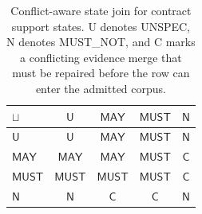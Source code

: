 \begin{table}[t]
\centering
\caption{Conflict-aware state join for contract support states. U denotes UNSPEC, N denotes MUST\_NOT, and C marks a conflicting evidence merge that must be repaired before the row can enter the admitted corpus.}
\label{tab:state-join}
\setlength{\tabcolsep}{2.5pt}
\begin{tabular}{@{}lcccc@{}}
\toprule
$\sqcup$ & $\mathsf{U}$ & $\mathsf{MAY}$ & $\mathsf{MUST}$ & $\mathsf{N}$ \\
\midrule
$\mathsf{U}$ & $\mathsf{U}$ & $\mathsf{MAY}$ & $\mathsf{MUST}$ & $\mathsf{N}$ \\
$\mathsf{MAY}$ & $\mathsf{MAY}$ & $\mathsf{MAY}$ & $\mathsf{MUST}$ & \textbf{\textcolor{vldbRose}{$\mathsf{C}$}} \\
$\mathsf{MUST}$ & $\mathsf{MUST}$ & $\mathsf{MUST}$ & $\mathsf{MUST}$ & \textbf{\textcolor{vldbRose}{$\mathsf{C}$}} \\
$\mathsf{N}$ & $\mathsf{N}$ & \textbf{\textcolor{vldbRose}{$\mathsf{C}$}} & \textbf{\textcolor{vldbRose}{$\mathsf{C}$}} & $\mathsf{N}$ \\
\bottomrule
\end{tabular}
\end{table}
